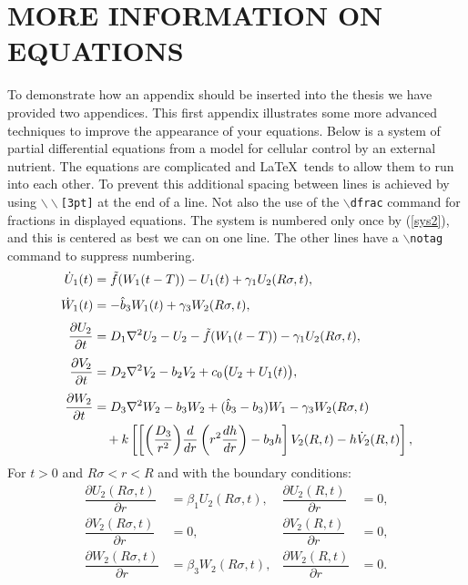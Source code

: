 \appendices
%
%

\chapter{MORE INFORMATION ON EQUATIONS}

To demonstrate how an appendix should be inserted into the thesis
we have provided two appendices. This first appendix illustrates some
more advanced techniques to improve the appearance of your equations.
Below is a system of partial differential equations from a model for
cellular control by an external nutrient. The equations are complicated
and \LaTeX\ tends to allow them to run into each other. To prevent this
additional spacing between lines is achieved by using 
{\tt $\backslash\backslash$[3pt]} at the end of a line.  
Not also the use of the {\tt $\backslash$dfrac} command for fractions
in displayed equations.
The system is numbered only once by (\ref{sys2}), and
this is centered as best we can on one line.  The other lines have a
{\tt $\backslash$notag} command to suppress numbering.
\begin{align}
  \dot{U}_1(t) & = \tilde f(W_1(t-T)) - U_1(t) + \gamma_1U_2(R\sigma,
   t),	\notag \\[3pt]
  \dot{W}_1(t) & =  -\hat b_3W_1(t) + \gamma_3W_2(R\sigma,
   t),\notag \\[3pt]
  \frac{\partial U_2}{\partial t} & =  D_1\nabla^2U_2 - U_2 - \tilde f(W_1
    (t-T)) - \gamma_1U_2(R\sigma,t){\vrule width 0in depth .1in},
	\label{sys2} \\[3pt]
  \frac{\partial V_2}{\partial t} & =  D_2\nabla^2V_2 - b_2V_2 + c_0
    \bigl(U_2 + U_1(t)\bigr), \\[3pt]
  \frac{\partial W_2}{\partial t} & =  D_3\nabla^2W_2 - b_3W_2 + (\hat b_3
    -b_3)W_1 - \gamma_3W_2(R\sigma,t) \\
    &  \quad + k\left[\left[{\left(\frac{D_3}{r^2}\right)}\frac{d}{dr}\left(r^2
	   \frac{dh}{dr}\right) - b_3h\right]V_2(R,t) - h\dot V_2(R,t)
	   \right], 
\end{align}
For $t > 0$ and $R\sigma < r < R$ and with the boundary conditions:
\begin{align*}
 \dfrac{\partial U_2(R\sigma,t)}{\partial r} & = 
 \beta_1U_2(R\sigma,t), & 
 \dfrac{\partial U_2(R,t)}{\partial r} & =  0, \\
 \dfrac{\partial V_2(R\sigma,t)}{\partial r} & =  0, &
 \dfrac{\partial V_2(R,t)}{\partial r} & =  0,  \\
 \dfrac{\partial W_2(R\sigma,t)}{\partial r} & = 
   \beta_3W_2(R\sigma,t), & 
 \dfrac{\partial W_2(R,t)}{\partial r} & =    0.
\end{align*}

